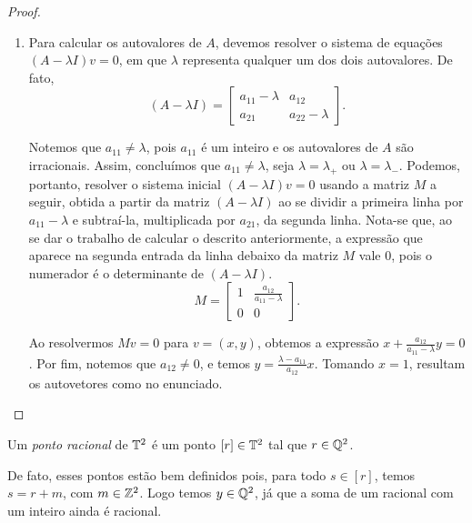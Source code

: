 \begin{proof}
\begin{enumerate}
	\item Para calcular os autovalores de $A$, devemos resolver o sistema de equações $(A-\lambda I)v = 0$, em que $\lambda$ representa qualquer um dos dois autovalores. De fato,
	\begin{equation*}
		(A-\lambda I) = \begin{bmatrix}
		a_{11} - \lambda & a_{12} \\
		a_{21} & a_{22} - \lambda
		\end{bmatrix} \text{.}
		\end{equation*}

Notemos que $a_{11} \neq \lambda$, pois $a_{11}$ é um inteiro e os autovalores de $A$ são irracionais. Assim, concluímos que $a_{11} \neq \lambda$, seja $\lambda = \lambda_{+}$ ou $\lambda = \lambda_{-}$. Podemos, portanto, resolver o sistema inicial $(A-\lambda I)v = 0$ usando a matriz $M$ a seguir, obtida a partir da matriz $(A-\lambda I)$ ao se dividir a primeira linha por $a_{11}-\lambda$ e subtraí-la, multiplicada por $a_{21}$, da segunda linha. Nota-se que, ao se dar o trabalho de calcular o descrito anteriormente, a expressão que aparece na segunda entrada da linha debaixo da matriz $M$ vale $0$, pois o numerador é o determinante de $(A-\lambda I)$.
	\begin{equation*}
		M = \begin{bmatrix}
		1 & \frac{a_{12}}{a_{11}-\lambda} \\
		0 & 0
		\end{bmatrix} \text{.}
		\end{equation*}

Ao resolvermos $Mv = 0$ para $v = (x,y)$, obtemos a expressão $x + \frac{a_{12}}{a_{11}-\lambda}y = 0$. Por fim, notemos que $a_{12} \neq 0$, e temos $y = \frac{\lambda-a_{11}}{a_{12}}x$. Tomando $x = 1$, resultam os autovetores como no enunciado.
	\end{enumerate}
\end{proof}

\begin{definition}
Um \textit{ponto racional} de $\mathbb{T}^2$ é um ponto $[r] \in \mathbb{T}^2$ tal que $r \in \mathbb{Q}^2$.
\end{definition}
De fato, esses pontos estão bem definidos pois, para todo $s \in [r]$, temos $s = r + m$, com $m \in \mathbb{Z}^2$. Logo temos $y \in \mathbb{Q}^2$, já que a soma de um racional com um inteiro ainda é racional.

